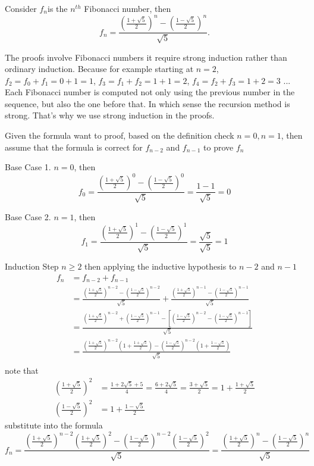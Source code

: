 \documentclass{report}
\begin{document}
\begin{thm}\label{thm:propprod}
Consider $f_n$is the $n^{th}$ Fibonacci number, then
\begin{displaymath}
f_n=\frac{\left(\frac{1+\sqrt{5}}{2}\right)^n-\left(\frac{1-\sqrt{5}}{2}\right)^n}{\sqrt{5}}.
\end{displaymath}
\end{thm}
The proofs involve Fibonacci numbers it require strong induction rather than ordinary induction.
Because for example starting at $n=2$, $f_2 = f_0 + f_1 = 0+1 = 1$, $f_3 = f_1 + f_2 = 1 + 1 = 2$, $f_4 = f_2 + f_3 = 1 + 2 = 3$ ... Each Fibonacci number is computed not only using the previous number in the sequence, but also the one before that. In which sense the recursion method is strong. That's why we use strong induction in the proofs.
\\
\newline
\begin{prf}
Given the formula want to proof, based on the definition check $n=0,n=1$, then assume that
the formula is correct for $f_{n-2}$ and $f_{n-1}$ to prove $f_n$

Base Case 1. $n=0$, then
\[
f_0=\frac{\left(\frac{1+\sqrt{5}}{2}\right)^0-\left(\frac{1-\sqrt{5}}{2}\right)^0}{\sqrt{5}}
=\frac{1-1}{\sqrt{5}}=0
\]

Base Case 2. $n=1$, then
\[
f_1=\frac{\left(\frac{1+\sqrt{5}}{2}\right)^1-\left(\frac{1-\sqrt{5}}{2}\right)^1}{\sqrt{5}}
=\frac{\sqrt{5}}{\sqrt{5}}=1
\]

Induction Step $n\geqslant2$ then applying the inductive hypothesis to $n-2$ and $n-1$
\begin{align*}
f_n&=f_{n-2}+f_{n-1}\\
&=\frac{\left(\frac{1+\sqrt{5}}{2}\right)^{n-2}-\left(\frac{1-\sqrt{5}}{2}\right)^{n-2}}{\sqrt{5}}+
\frac{\left(\frac{1+\sqrt{5}}{2}\right)^{n-1}-\left(\frac{1-\sqrt{5}}{2}\right)^{n-1}}{\sqrt{5}}\\
&=\frac{\left(\frac{1+\sqrt{5}}{2}\right)^{n-2}+\left(\frac{1-\sqrt{5}}{2}\right)^{n-1}-
\left[\left(\frac{1-\sqrt{5}}{2}\right)^{n-2}-\left(\frac{1-\sqrt{5}}{2}\right)^{n-1}\right]}{\sqrt{5}}\\
&=\frac{\left(\frac{1+\sqrt{5}}{2}\right)^{n-2}\left(1+\frac{1+\sqrt{5}}{2}\right)-\left(\frac{1-\sqrt{5}}{2}\right)^{n-2}\left(1+\frac{1-\sqrt{5}}{2}\right)}{\sqrt{5}}\\
\end{align*}
note that
\begin{align*}
\left(\frac{1+\sqrt{5}}{2}\right)^2&=\frac{1+2\sqrt{5}+5}{4}=\frac{6+2\sqrt{5}}{4}=\frac{3+\sqrt{5}}{2}=1+\frac{1+\sqrt{5}}{2}\\
\left(\frac{1-\sqrt{5}}{2}\right)^2&=1+\frac{1-\sqrt{5}}{2}
\end{align*}
substitute into the formula
\[
f_n=\frac{\left(\frac{1+\sqrt{5}}{2}\right)^{n-2}\left(\frac{1+\sqrt{5}}{2}\right)^{2}-
\left(\frac{1-\sqrt{5}}{2}\right)^{n-2}\left(\frac{1-\sqrt{5}}{2}\right)^{2}}{\sqrt{5}}=
\frac{\left(\frac{1+\sqrt{5}}{2}\right)^{n}-
\left(\frac{1-\sqrt{5}}{2}\right)^{n}}{\sqrt{5}}
\]

\Qed
\end{prf}
\end{document}
